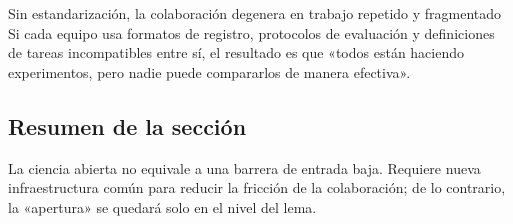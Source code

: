 \begin{warningbox}{Sin estandarización, la colaboración degenera en trabajo repetido y fragmentado}
Si cada equipo usa formatos de registro, protocolos de evaluación y definiciones de tareas incompatibles entre sí, el resultado es que «todos están haciendo experimentos, pero nadie puede compararlos de manera efectiva».
\end{warningbox}

\subsection{Resumen de la sección}
La ciencia abierta no equivale a una barrera de entrada baja. Requiere nueva infraestructura común para reducir la fricción de la colaboración; de lo contrario, la «apertura» se quedará solo en el nivel del lema.
